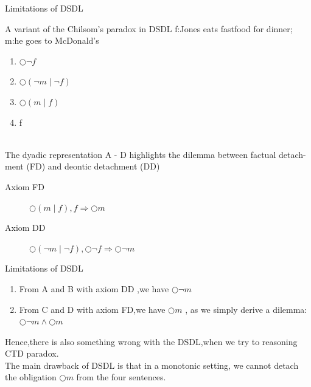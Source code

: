 \documentclass{beamer}
\begin{document}
\begin{frame}{Limitations of DSDL}
\begin{block}{A variant of the Chilsom's paradox in DSDL}
f:Jones eats fastfood for dinner; m:he goes to McDonald’s 
\begin{enumerate}
\item[A]$\bigcirc \neg f$
\item[B]$\bigcirc(\neg m \mid \neg f)$
\item[C]$\bigcirc(m\mid f)$
\item[D]f
\end{enumerate}
\end{block}
\\
The dyadic representation A - D highlights the dilemma between factual detach-ment (FD) and deontic detachment (DD)
\begin{description}
\item[Axiom FD]$\bigcirc(m\mid f),f \Rightarrow \bigcirc m$\\
\item[Axiom DD]$\bigcirc(\neg m \mid \neg f), \bigcirc\neg f \Rightarrow \bigcirc\neg m$\\
\end{description}
\end{frame}
\begin{frame}{Limitations of DSDL}
\begin{enumerate}
    \item From A and B with axiom DD ,we have $\bigcirc\neg  m$
    \item From C and D with axiom FD,we have $\bigcirc m$ , as we simply derive a dilemma:$\bigcirc\neg m\wedge\bigcirc m$\\
\end{enumerate}
Hence,there is also something wrong with the DSDL,when we try to reasoning CTD paradox.\\
The main drawback of DSDL is that in a monotonic setting, we cannot detach
the obligation $\bigcirc m$ from the four sentences.

\end{frame}
\end{document}
